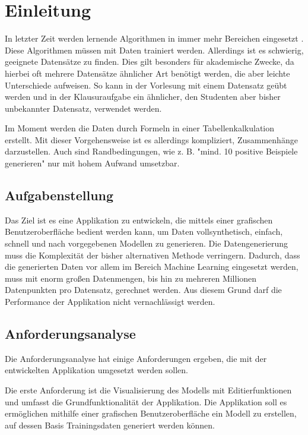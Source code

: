
\chapter{Einleitung}

In letzter Zeit werden lernende Algorithmen in immer mehr Bereichen eingesetzt \cite{mengesonnentag:2018}. Diese Algorithmen müssen mit Daten trainiert werden. Allerdings ist es schwierig, geeignete Datensätze zu finden. Dies gilt besonders für akademische Zwecke, da hierbei oft mehrere Datensätze ähnlicher Art benötigt werden, die aber leichte Unterschiede aufweisen. So kann in der Vorlesung mit einem Datensatz geübt werden und in der Klausuraufgabe ein ähnlicher, den Studenten aber bisher unbekannter Datensatz, verwendet werden.

Im Moment werden die Daten durch Formeln in einer Tabellenkalkulation erstellt. Mit dieser Vorgehensweise ist es allerdings kompliziert, Zusammenhänge darzustellen. Auch sind Randbedingungen, wie z. B. "mind. 10 positive Beispiele generieren" nur mit hohem Aufwand umsetzbar.

\section{Aufgabenstellung}

Das Ziel ist es eine Applikation zu entwickeln, die mittels einer grafischen Benutzeroberfläche bedient werden kann, um Daten vollsynthetisch, einfach, schnell und nach vorgegebenen Modellen zu generieren. Die Datengenerierung muss die Komplexität der bisher alternativen Methode verringern. Dadurch, dass die generierten Daten vor allem im Bereich Machine Learning eingesetzt werden, muss mit enorm großen Datenmengen, bis hin zu mehreren Millionen Datenpunkten pro Datensatz, gerechnet werden. Aus diesem Grund darf die Performance der Applikation nicht vernachlässigt werden.

\section{Anforderungsanalyse}
\label{sec:anforderungsanalyse}
Die Anforderungsanalyse hat einige Anforderungen ergeben, die mit der entwickelten Applikation umgesetzt werden sollen.

Die erste Anforderung ist die Visualisierung des Modells mit Editierfunktionen und umfasst die Grundfunktionalität der Applikation. Die Applikation soll es ermöglichen mithilfe einer grafischen Benutzeroberfläche ein Modell zu erstellen, auf dessen Basis Trainingsdaten generiert werden können.

